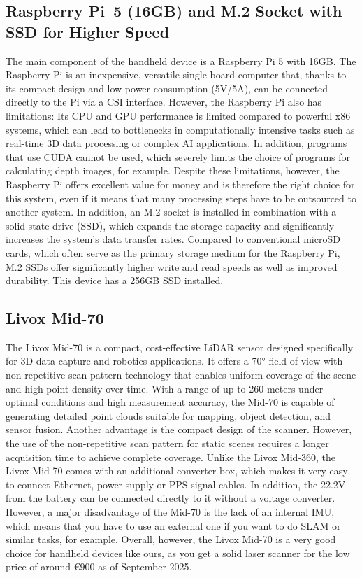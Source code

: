 \documentclass[english, bachelor, utf8]{base/thesis_telematics}
\begin{document}
\subsection*{Raspberry Pi~5 (16GB) and M.2 Socket with SSD for Higher Speed}
The main component of the handheld device is a Raspberry Pi 5 with 16GB. 
The Raspberry Pi is an inexpensive, versatile single-board computer that, thanks to its compact design and low power consumption (5V/5A), 
can be connected directly to the Pi via a CSI interface.
However, the Raspberry Pi also has limitations: Its CPU and GPU performance is limited compared to powerful x86 systems, which can lead to 
bottlenecks in computationally intensive tasks such as real-time 3D data processing or complex AI applications. In addition, programs that 
use CUDA cannot be used, which severely limits the choice of programs for calculating depth images, for example. Despite these limitations, 
however, the Raspberry Pi offers excellent value for money and is therefore the right choice for this system, even if it means that many 
processing steps have to be outsourced to another system.
In addition, an M.2 socket is installed in combination with a solid-state drive (SSD), which expands the storage capacity and significantly 
increases the system's data transfer rates. Compared to conventional microSD cards, which often serve as the primary storage medium for the 
Raspberry Pi, M.2 SSDs offer significantly higher write and read speeds as well as improved durability. This device has a 256GB SSD installed.

\subsection*{Livox Mid-70}
    The Livox Mid-70 is a compact, cost-effective LiDAR sensor designed specifically for 3D data capture and robotics applications. 
    It offers a 70° field of view with non-repetitive scan pattern technology that enables uniform coverage of the scene and high point 
    density over time. With a range of up to 260 meters under optimal conditions and high measurement accuracy, the Mid-70 is capable of 
    generating detailed point clouds suitable for mapping, object detection, and sensor fusion. Another advantage is the compact design of the scanner. 
    However, the use of the non-repetitive scan pattern for static scenes requires a longer acquisition time to achieve complete coverage. Unlike the Livox Mid-360, 
    the Livox Mid-70 comes with an additional converter box, which makes it very easy to connect Ethernet, power supply or PPS signal cables. In addition, the 22.2V 
    from the battery can be connected directly to it without a voltage converter. However, a major disadvantage of the Mid-70 is the lack of an internal IMU, which 
    means that you have to use an external one if you want to do SLAM or similar tasks, for example. Overall, however, the Livox Mid-70 is a very good choice for 
    handheld devices like ours, as you get a solid laser scanner for the low price of around €900 as of September 2025.
\end{document}
